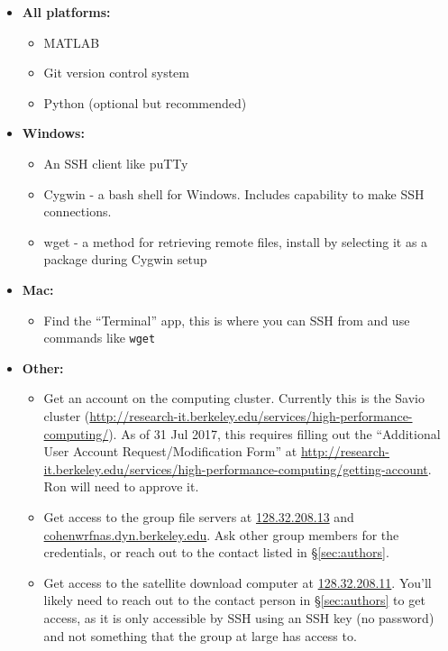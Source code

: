 \documentclass[12pt]{article}
\begin{document}
	\begin{itemize}
	\item \textbf{All platforms:}
		\begin{itemize}
		\item MATLAB
		\item Git version control system
		\item Python (optional but recommended)
		\end{itemize}
		
	\item \textbf{Windows:}
		\begin{itemize}
		\item An SSH client like puTTy
		\item Cygwin - a bash shell for Windows. Includes capability to make SSH connections.
		\item wget - a method for retrieving remote files, install by selecting it as a package during Cygwin setup
		\end{itemize}
		
	\item \textbf{Mac:}
		\begin{itemize}
		\item Find the ``Terminal'' app, this is where you can SSH from and use commands like \texttt{wget}
		\end{itemize}
		
	\item \textbf{Other:}
		\begin{itemize}
		\item Get an account on the computing cluster. Currently this is the Savio cluster (\url{http://research-it.berkeley.edu/services/high-performance-computing/}). As of 31 Jul 2017, this requires filling out the ``Additional User Account Request/Modification Form'' at \url{http://research-it.berkeley.edu/services/high-performance-computing/getting-account}. Ron will need to approve it.
			
		\item Get access to the group file servers at \url{128.32.208.13} and \url{cohenwrfnas.dyn.berkeley.edu}. Ask other group members for the credentials, or reach out to the contact listed in \S\ref{sec:authors}.
		
		\item Get access to the satellite download computer at \url{128.32.208.11}. You'll likely need to reach out to the contact person in \S\ref{sec:authors} to get access, as it is only accessible by SSH using an SSH key (no password) and not something that the group at large has access to.
		\end{itemize}
	\end{itemize}
	
\end{document}
